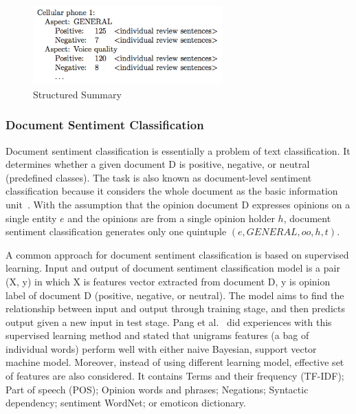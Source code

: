 \documentclass{article}
\begin{document}
\begin{figure}[ht]
\centering
\includegraphics[width=0.65\textwidth]{AbOS}
\caption{Structured Summary}
\label{fir:abos}
\end{figure}

\subsubsection{Document Sentiment Classification}

Document sentiment classification is essentially a problem of text classification.
It determines whether a given document D is positive, negative, or neutral (predefined classes).
The task is also known as document-level sentiment classification because it considers the whole document as the basic information unit~\cite{Liu2012}.
With the assumption that the opinion document D expresses opinions on a single entity $e$ and the opinions are from a single opinion holder $h$, document sentiment classification generates only one quintuple $(e,GENERAL,oo,h,t)$. 

A common approach for document sentiment classification is based on supervised learning.
Input and output of document sentiment classification model is a pair (X, y) in which X is features vector extracted from document D, y is opinion label of document D (positive, negative, or neutral).
The model aims to find the relationship between input and output through training stage, and then predicts output given a new input in test stage.
Pang et al.~\cite{Pang:2002:TUS:1118693.1118704} did experiences with this supervised learning method and stated that unigrams features (a bag of individual words) perform well with either naive Bayesian, support vector machine model.
Moreover, instead of using different learning model, effective set of features are also considered. It contains Terms and their frequency (TF-IDF); Part of speech (POS); Opinion words and phrases; Negations; Syntactic dependency; sentiment WordNet; or emoticon dictionary.
\end{document}
